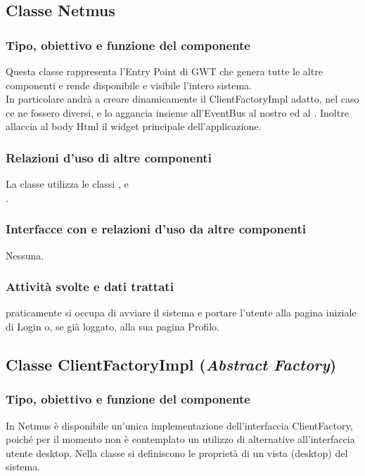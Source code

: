 \subsection{Classe Netmus}
\subsubsection*{Tipo, obiettivo e funzione del componente}
Questa classe rappresenta l'Entry Point di GWT che genera tutte le altre
componenti e rende disponibile e visibile l'intero sistema.\\
In particolare andr\`a a creare dinamicamente il ClientFactoryImpl adatto, nel
caso ce ne fossero diversi, e lo aggancia insieme all'EventBus al nostro
 ed al .
Inoltre allaccia al body Html il widget principale dell'applicazione.

\subsubsection*{Relazioni d'uso di altre componenti}
La classe  utilizza le classi ,
 e \\.

\subsubsection*{Interfacce con e relazioni d'uso da altre componenti}
Nessuna.

\subsubsection*{Attivit\`a svolte e dati trattati}
 praticamente si occupa di avviare il sistema e portare l'utente alla
pagina iniziale di Login o, se gi\`a loggato, alla sua pagina Profilo.

\subsection{Classe ClientFactoryImpl (\emph{Abstract Factory})}
\subsubsection*{Tipo, obiettivo e funzione del componente}
In Netmus \`e disponibile un'unica implementazione dell'interfaccia
ClientFactory, poich\'e per il momento non \`e contemplato un utilizzo di
alternative all'interfaccia utente desktop.
Nella classe si definiscono le propriet\`a di un vista (desktop) del
sistema.

